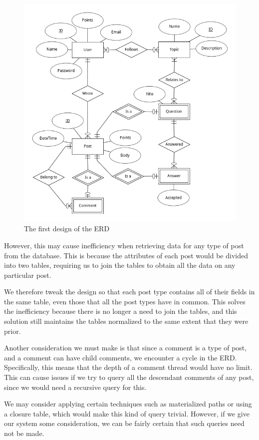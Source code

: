\begin{figure}[htbp]
	\centering
	\includegraphics[width=\linewidth]{images/erd1.png}
	\caption{The first design of the ERD}
	\label{erd1}
\end{figure}

However, this may cause inefficiency when retrieving data for any type of post from the database. This is because the attributes of each post would be divided into two tables, requiring us to join the tables to obtain all the data on any particular post.

We therefore tweak the design so that each post type contains all of their fields in the same table, even those that all the post types have in common. This solves the inefficiency because there is no longer a need to join the tables, and this solution still maintains the tables normalized to the same extent that they were prior.

Another consideration we must make is that since a comment is a type of post, and a comment can have child comments, we encounter a cycle in the ERD. Specifically, this means that the depth of a comment thread would have no limit. This can cause issues if we try to query all the descendant comments of any post, since we would need a recursive query for this.

We may consider applying certain techniques such as materialized paths or using a closure table, which would make this kind of query trivial. However, if we give our system some consideration, we can be fairly certain that such queries need not be made.

